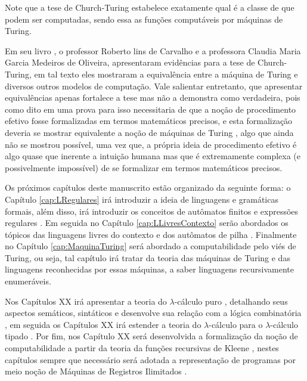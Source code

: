 \begin{rema}
	Note que a tese de Church-Turing estabelece exatamente qual é a classe de que podem ser computadas, sendo essa as funções computáveis por máquinas de Turing.
\end{rema}

Em seu livro \cite{roberto1998}, o professor Roberto lins de Carvalho e a professora Claudia Maria Garcia Medeiros de Oliveira, apresentaram evidências para a tese de Church-Turing, em tal texto eles mostraram a equivalência entre a máquina de Turing e diversos outros modelos de computação. Vale salientar entretanto, que apresentar equivalências apenas fortalece a tese mas não a demonstra como verdadeira, pois como dito em \cite{benjaLivro2010, roberto1998, sernadas2006} uma prova para isso necessitaria de que a noção de procedimento efetivo fosse formalizadas em termos matemáticos precisos, e esta formalização deveria se mostrar equivalente a noção de máquinas de Turing \cite{benjaLivro2010}, algo que ainda não se mostrou possível, uma vez que, a própria ideia de procedimento efetivo é algo quase que inerente a intuição humana mas que é extremamente complexa (e possivelmente impossível) de se formalizar em termos matemáticos precisos.

Os próximos capítulos deste manuscrito estão organizado da seguinte forma: o Capítulo \ref{cap:LRegulares} irá introduzir a ideia de linguagens e gramáticas formais, além disso, irá introduzir os conceitos de autômatos finitos e expressões regulares \cite{benjaLivro2010, hopcroft2008, linz2006}. Em seguida no Capítulo \ref{cap:LLivresContexto} serão abordados os tópicos das linguagens livres do contexto e dos autômatos de pilha \cite{benjaLivro2010, menezes1998LFA}. Finalmente no Capítulo \ref{cap:MaquinaTuring} será abordado a computabilidade pelo viés de Turing, ou seja, tal capítulo irá tratar da teoria das máquinas de Turing \cite{benjaLivro2010, menezes1998LFA, turing1937} e das linguagens reconhecidas por essas máquinas, a saber linguagens recursivamente enumeráveis. 

Nos Capítulos XX irá apresentar a teoria do $\lambda$-cálculo puro \cite{bare1984, henk1992, hankin2004}, detalhando seus aspectos semáticos, sintáticos e desenvolve sua relação com a lógica combinatória \cite{bimbo2019, hankin2004}, em seguida os Capítulos XX irá estender a teoria do $\lambda$-cálculo para o $\lambda$-cálculo tipado \cite{henk1992, hankin2004}. Por fim, nos Capítulo XX será desenvolvida a formalização da noção de computabilidade a partir da teoria da funções recursivas de Kleene \cite{kleene1936}, nestes capítulos sempre que necessário será adotada a representação de programas por meio noção de Máquinas de Registros Ilimitados \cite{cutland1980, menezes2003}. 

